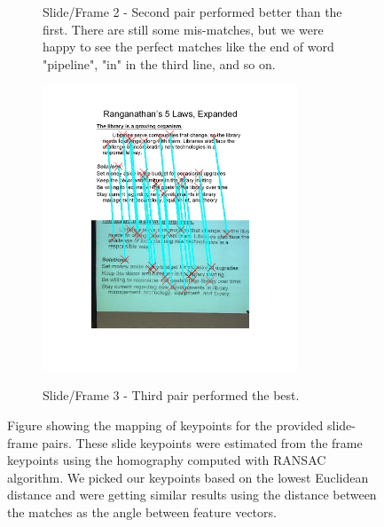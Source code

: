 \begin{figure}[ht]
\begin{subfigure}{0.4\textwidth}
		\caption{Slide/Frame 2 - Second pair performed better than the first. There are still some mis-matches, but we were happy to see the perfect matches like the end of word "pipeline", "in" in the third line, and so on.}
	\end{subfigure}
	\begin{subfigure}{0.4\textwidth}
	    {\includegraphics[width=3in]{new_figs/fCSF3x.jpg}}
	    \caption{Slide/Frame 3 -  Third pair performed the best.}
	\end{subfigure}
	\caption{ Figure showing the mapping of keypoints for the provided slide-frame pairs. These slide keypoints were estimated from the frame keypoints using the homography computed with RANSAC algorithm. We picked our keypoints based on the lowest Euclidean distance and were getting similar results using the distance between the matches as the angle between feature vectors.}
\label{fig:slideframeC}
\end{figure}

